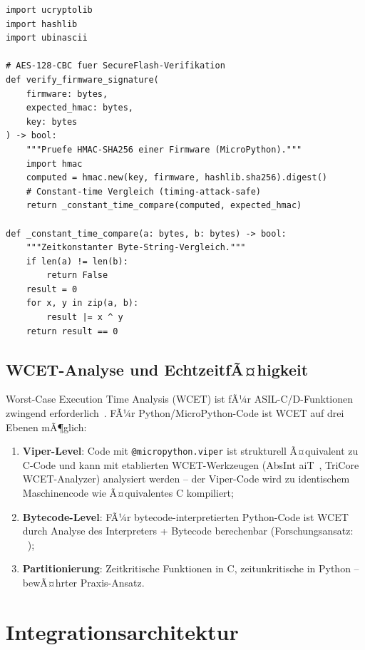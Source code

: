 ﻿\documentclass[12pt,a4paper,twoside]{article}
\begin{document}
\begin{lstlisting}[language=MicroPython,caption={Sicherheits-relevante Kryptographie in MicroPython},label=lst:crypto]
import ucryptolib
import hashlib
import ubinascii

# AES-128-CBC fuer SecureFlash-Verifikation
def verify_firmware_signature(
    firmware: bytes,
    expected_hmac: bytes,
    key: bytes
) -> bool:
    """Pruefe HMAC-SHA256 einer Firmware (MicroPython)."""
    import hmac
    computed = hmac.new(key, firmware, hashlib.sha256).digest()
    # Constant-time Vergleich (timing-attack-safe)
    return _constant_time_compare(computed, expected_hmac)

def _constant_time_compare(a: bytes, b: bytes) -> bool:
    """Zeitkonstanter Byte-String-Vergleich."""
    if len(a) != len(b):
        return False
    result = 0
    for x, y in zip(a, b):
        result |= x ^ y
    return result == 0
\end{lstlisting}

\subsection{WCET-Analyse und EchtzeitfÃ¤higkeit}
\label{subsec:wcet}

Worst-Case Execution Time Analysis (WCET) ist fÃ¼r ASIL-C/D-Funktionen
zwingend erforderlich~\cite{wilhelm2008wcet}.
FÃ¼r Python/MicroPython-Code ist WCET auf drei Ebenen mÃ¶glich:

\begin{enumerate}
  \item \textbf{Viper-Level}: Code mit \texttt{@micropython.viper} ist
        strukturell Ã¤quivalent zu C-Code und kann mit etablierten
        WCET-Werkzeugen (AbsInt aiT~\cite{absint_ait}, TriCore WCET-Analyzer)
        analysiert werden -- der Viper-Code wird zu identischem Maschinencode
        wie Ã¤quivalentes C kompiliert;
  \item \textbf{Bytecode-Level}: FÃ¼r bytecode-interpretierten Python-Code
        ist WCET durch Analyse des Interpreters + Bytecode berechenbar
        (Forschungsansatz: ~\cite{micropython_wcet2023});
  \item \textbf{Partitionierung}: Zeitkritische Funktionen in C, zeitunkritische
        in Python -- bewÃ¤hrter Praxis-Ansatz.
\end{enumerate}

\section{Integrationsarchitektur}
\label{sec:architektur}
\end{document}
